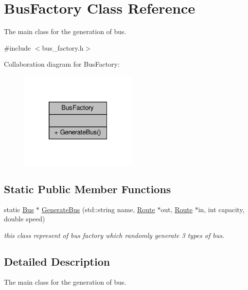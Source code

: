 \hypertarget{classBusFactory}{}\section{Bus\+Factory Class Reference}
\label{classBusFactory}


The main class for the generation of bus.  




{\ttfamily \#include $<$bus\+\_\+factory.\+h$>$}



Collaboration diagram for Bus\+Factory\+:
\nopagebreak
\begin{figure}[H]
\begin{center}
\leavevmode
\includegraphics[width=169pt]{classBusFactory__coll__graph}
\end{center}
\end{figure}
\subsection*{Static Public Member Functions}
\begin{DoxyCompactItemize}
\item 
static \hyperlink{classBus}{Bus} $\ast$ \hyperlink{classBusFactory_aea064c9058b7c1592ae5c12ee409c747}{Generate\+Bus} (std\+::string name, \hyperlink{classRoute}{Route} $\ast$out, \hyperlink{classRoute}{Route} $\ast$in, int capacity, double speed)
\begin{DoxyCompactList}\small\item\em this class represent of bus factory which randomly generate 3 types of bus. \end{DoxyCompactList}\end{DoxyCompactItemize}


\subsection{Detailed Description}
The main class for the generation of bus. 

